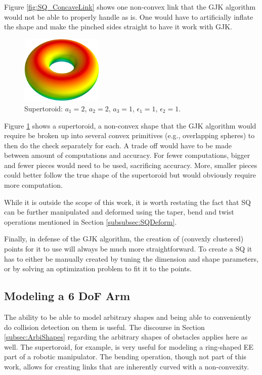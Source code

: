 Figure \ref{fig:SQ_ConcaveLink} shows one non-convex link that the \gls{GJK} algorithm would not be able to properly handle as is. One would have to artificially inflate the shape and make the pinched sides straight to have it work with \gls{GJK}.

\begin{figure}[h]
	\centering
	\includegraphics[width=0.35\textwidth]{import/SQ_Toroid}
	\caption{Supertoroid: $a_1=2$, $a_2=2$, $a_3=1$, $\epsilon_1=1$, $\epsilon_2=1$. }
	\label{fig:SQ_Toroid}
\end{figure} 

Figure \ref{fig:SQ_Toroid} shows a supertoroid, a non-convex shape that the \gls{GJK} algorithm would require be broken up into several convex primitives (e.g., overlapping spheres) to then do the check separately for each. A trade off would have to be made between amount of computations and accuracy. For fewer computations, bigger and fewer pieces would need to be used, sacrificing accuracy. More, smaller pieces could better follow the true shape of the supertoroid but would obviously require more computation.

While it is outside the scope of this work, it is worth restating the fact that \gls{SQ} can be further manipulated and deformed using the taper, bend and twist operations mentioned in Section \ref{subsubsec:SQDeform}.  

Finally, in defense of the \gls{GJK} algorithm, the creation of (convexly clustered) points for it to use will always be much more straightforward. To create a \gls{SQ} it has to either be manually created by tuning the dimension and shape parameters, or by solving an optimization problem to fit it to the points.


\subsection{Modeling a 6 DoF Arm}

The ability to be able to model arbitrary shapes and being able to conveniently do collision detection on them is useful. The discourse in Section \ref{subsec:ArbiShapes} regarding the arbitrary shapes of obstacles applies here as well. The supertoroid, for example, is very useful for modeling a ring-shaped \gls{EE} part of a robotic manipulator. The bending operation, though not part of this work, allows for creating links that are inherently curved with a non-convexity.

